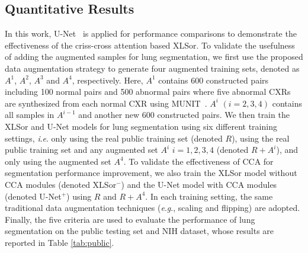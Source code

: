 \documentclass{midl} \usepackage{multirow}
\newcommand{\ie}{\textit{i}.\textit{e}. }
\newcommand{\eg}{\textit{e}.\textit{g}., }
\begin{document}
\subsection{Quantitative Results}
In this work, U-Net~\cite{U-net} is applied for performance comparisons to demonstrate the effectiveness of the criss-cross attention based XLSor. 
To validate the usefulness of adding the augmented samples for lung segmentation, we first use the proposed data augmentation strategy to generate four augmented training sets, denoted as $A^1$, $A^2$, $A^3$ and $A^4$, respectively. Here, $A^1$ contains 600 constructed pairs including 100 normal pairs and 500 abnormal pairs where five abnormal CXRs are synthesized from each normal CXR using MUNIT~\cite{munit}. $A^i$ $(i=2,3,4)$ contains all samples in $A^{i-1}$ and another new 600 constructed pairs.
We then train the XLSor and U-Net models for lung segmentation using six different training settings, \ie only using the real public training set (denoted $R$), using the real public training set and any augmented set $A^i$ $i=1,2,3,4$ (denoted $R+A^i$), and only using the augmented set $A^4$. 
To validate the effectiveness of CCA for segmentation performance improvement, we also train the XLSor model without CCA modules (denoted XLSor$^-$) and the U-Net model with CCA modules (denoted U-Net$^+$) using $R$ and $R+A^4$.
In each training setting, the same traditional data augmentation techniques (\eg scaling and flipping) are adopted. Finally, the five criteria are used to evaluate the performance of lung segmentation on the public testing set and NIH dataset, whose results are reported in Table \ref{tab:public}.
\end{document}
